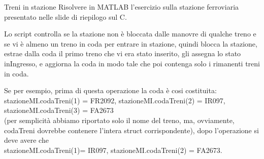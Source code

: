 \documentclass[aspectratio=169, handout]{beamer}
\begin{document}
\begin{frame}[allowframebreaks]{Treni in stazione}
    Risolvere in MATLAB l'esercizio sulla stazione ferroviaria presentato nelle slide di riepilogo sul C.

    Lo script controlla se la stazione non è bloccata dalle manovre di qualche
    treno e se vi è almeno un treno in coda per entrare in stazione, quindi blocca la stazione, estrae dalla coda il
    primo treno che vi era stato inserito, gli assegna lo stato inIngresso, e aggiorna la coda in modo tale
    che poi contenga solo i rimanenti treni in coda.

    \break
    Se per esempio, prima di questa operazione la coda è cosi costituita: \\
    stazioneMI.codaTreni(1) = FR2092, stazioneMI.codaTreni(2) = IR097,
    stazioneMI.codaTreni(3) = FA2673 \\
    (per semplicità abbiamo riportato solo il nome del treno, ma, ovviamente, codaTreni dovrebbe contenere l’intera
    struct corrispondente), dopo l’operazione si deve avere che\\
    stazioneMI.codaTreni(1)= IR097, stazioneMI.codaTreni(2) = FA2673.
\end{frame}
\end{document}

